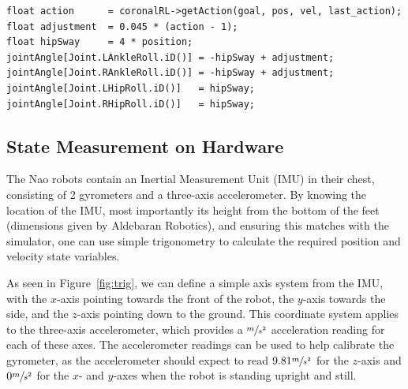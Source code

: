 \begin{lstlisting}
float action      = coronalRL->getAction(goal, pos, vel, last_action);
float adjustment  = 0.045 * (action - 1);
float hipSway     = 4 * position;
jointAngle[Joint.LAnkleRoll.iD()] = -hipSway + adjustment;
jointAngle[Joint.RAnkleRoll.iD()] = -hipSway + adjustment;
jointAngle[Joint.LHipRoll.iD()]   = hipSway;
jointAngle[Joint.RHipRoll.iD()]   = hipSway; 
\end{lstlisting}

\subsection{State Measurement on Hardware}

The Nao robots contain an Inertial Measurement Unit (IMU) in their chest, consisting of 2 gyrometers and a three-axis accelerometer.\cite{nao_imu} By knowing the location of the IMU, most importantly its height from the bottom of the feet (dimensions given by Aldebaran Robotics), and ensuring this matches with the simulator, one can use simple trigonometry to calculate the required position and velocity state variables. 

As seen in Figure~\ref{fig:trig}, we can define a simple axis system from the IMU, with the $x$-axis pointing towards the front of the robot, the $y$-axis towards the side, and the $z$-axis pointing down to the ground. This coordinate system applies to the three-axis accelerometer, which provides a $\sfrac{m}{s^2}$ acceleration reading for each of these axes. The accelerometer readings can be used to help calibrate the gyrometer, as the accelerometer should expect to read $9.81\sfrac{m}{s^2}$ for the $z$-axis and $0\sfrac{m}{s^2}$ for the $x$- and $y$-axes when the robot is standing upright and still.

